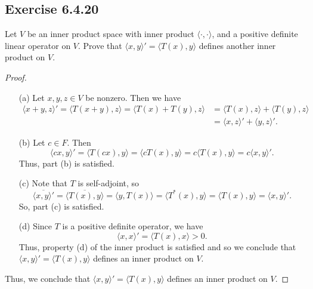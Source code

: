 \subsection*{Exercise 6.4.20} Let \( V  \) be an inner product space with inner product \( \langle \cdot , \cdot \rangle \), and a positive definite linear operator on \( V  \). Prove that \( \langle x , y \rangle' = \langle T(x) , y \rangle \) defines another inner product on \( V  \).
\begin{proof}
   \begin{enumerate}
       \item[(a)] Let \( x,y,z \in V  \) be nonzero. Then we have
           \begin{align*}
               \langle x+y , z  \rangle' = \langle T(x+y) , z \rangle = \langle T(x) + T(y) , z \rangle &= \langle T(x) , z \rangle + \langle T(y) , z \rangle  \\
                                                                            &= \langle x , z \rangle' + \langle y , z \rangle'.
    \end{align*}
    \item[(b)] Let \( c \in F  \). Then
        \[  \langle cx , y \rangle' = \langle T(cx) , y \rangle = \langle cT(x) , y \rangle = c \langle T(x) , y \rangle = c \langle x , y \rangle'.  \]
        Thus, part (b) is satisfied. 
    \item[(c)] Note that \( T  \) is self-adjoint, so 
        \[  \overline{\langle x , y \rangle'} = \overline{\langle T(x) , y \rangle} = \langle y , T(x) \rangle = \langle T^{*}(x) , y \rangle = \langle T(x) , y \rangle = \langle x , y \rangle'.  \]
        So, part (c) is satisfied.
    \item[(d)] Since \( T  \) is a positive definite operator, we have \[ \langle x , x \rangle' = \langle T(x) , x \rangle > 0.  \]
    Thus, property (d) of the inner product is satisfied and so we conclude that \( \langle x , y \rangle' = \langle T(x) , y \rangle  \) defines an inner product on \( V  \).
\end{enumerate}  
Thus, we conclude that \( \langle x , y \rangle' = \langle T(x) , y \rangle \) defines an inner product on \( V  \). 

\end{proof}

